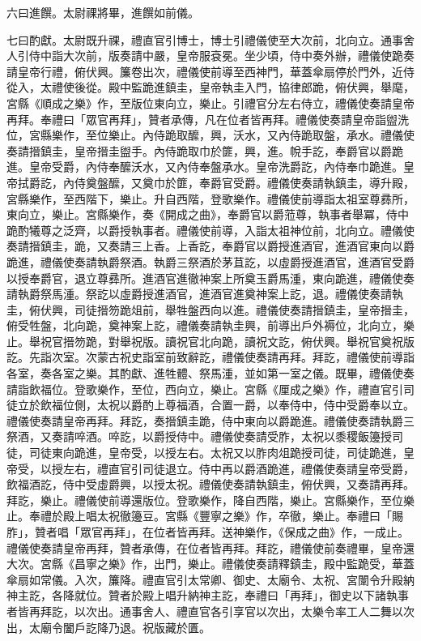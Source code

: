 \begin{pinyinscope}
 六曰進饌。太尉祼將畢，進饌如前儀。



 七曰酌獻。太尉既升祼，禮直官引博士，博士引禮儀使至大次前，北向立。通事舍人引侍中詣大次前，版奏請中嚴，皇帝服袞冕。坐少頃，侍中奏外辦，禮儀使跪奏請皇帝行禮，俯伏興。簾卷出次，禮儀使前導至西神門，華蓋傘扇停於門外，近侍從入，太禮使後從。殿中監跪進鎮圭，皇帝執圭入門，協律郎跪，俯伏興，舉麾，宮縣《順成之樂》作，至版位東向立，樂止。引禮官分左右侍立，禮儀使奏請皇帝再拜。奉禮曰「眾官再拜」，贊者承傳，凡在位者皆再拜。禮儀使奏請皇帝詣盥洗位，宮縣樂作，至位樂止。內侍跪取醿，興，沃水，又內侍跪取盤，承水。禮儀使奏請搢鎮圭，皇帝搢圭盥手。內侍跪取巾於篚，興，進。帨手訖，奉爵官以爵跪進。皇帝受爵，內侍奉醿沃水，又內侍奉盤承水。皇帝洗爵訖，內侍奉巾跪進。皇帝拭爵訖，內侍奠盤醿，又奠巾於篚，奉爵官受爵。禮儀使奏請執鎮圭，導升殿，宮縣樂作，至西階下，樂止。升自西階，登歌樂作。禮儀使前導詣太祖室尊彞所，東向立，樂止。宮縣樂作，奏《開成之曲》，奉爵官以爵蒞尊，執事者舉冪，侍中跪酌犧尊之泛齊，以爵授執事者。禮儀使前導，入詣太祖神位前，北向立。禮儀使奏請搢鎮圭，跪，又奏請三上香。上香訖，奉爵官以爵授進酒官，進酒官東向以爵跪進，禮儀使奏請執爵祭酒。執爵三祭酒於茅苴訖，以虛爵授進酒官，進酒官受爵以授奉爵官，退立尊彞所。進酒官進徹神案上所奠玉爵馬湩，東向跪進，禮儀使奏請執爵祭馬湩。祭訖以虛爵授進酒官，進酒官進奠神案上訖，退。禮儀使奏請執圭，俯伏興，司徒搢笏跪俎前，舉牲盤西向以進。禮儀使奏請搢鎮圭，皇帝搢圭，俯受牲盤，北向跪，奠神案上訖，禮儀奏請執圭興，前導出戶外褥位，北向立，樂止。舉祝官搢笏跪，對舉祝版。讀祝官北向跪，讀祝文訖，俯伏興。舉祝官奠祝版訖。先詣次室。次蒙古祝史詣室前致辭訖，禮儀使奏請再拜。拜訖，禮儀使前導詣各室，奏各室之樂。其酌獻、進牲體、祭馬湩，並如第一室之儀。既畢，禮儀使奏請詣飲福位。登歌樂作，至位，西向立，樂止。宮縣《厘成之樂》作，禮直官引司徒立於飲福位側，太祝以爵酌上尊福酒，合置一爵，以奉侍中，侍中受爵奉以立。禮儀使奏請皇帝再拜。拜訖，奏搢鎮圭跪，侍中東向以爵跪進。禮儀使奏請執爵三祭酒，又奏請啐酒。啐訖，以爵授侍中。禮儀使奏請受胙，太祝以黍稷飯籩授司徒，司徒東向跪進，皇帝受，以授左右。太祝又以胙肉俎跪授司徒，司徒跪進，皇帝受，以授左右，禮直官引司徒退立。侍中再以爵酒跪進，禮儀使奏請皇帝受爵，飲福酒訖，侍中受虛爵興，以授太祝。禮儀使奏請執鎮圭，俯伏興，又奏請再拜。拜訖，樂止。禮儀使前導還版位。登歌樂作，降自西階，樂止。宮縣樂作，至位樂止。奉禮於殿上唱太祝徹籩豆。宮縣《豐寧之樂》作，卒徹，樂止。奉禮曰「賜胙」，贊者唱「眾官再拜」，在位者皆再拜。送神樂作，《保成之曲》作，一成止。禮儀使奏請皇帝再拜，贊者承傳，在位者皆再拜。拜訖，禮儀使前奏禮畢，皇帝還大次。宮縣《昌寧之樂》作，出門，樂止。禮儀使奏請釋鎮圭，殿中監跪受，華蓋傘扇如常儀。入次，簾降。禮直官引太常卿、御史、太廟令、太祝、宮闈令升殿納神主訖，各降就位。贊者於殿上唱升納神主訖，奉禮曰「再拜」，御史以下諸執事者皆再拜訖，以次出。通事舍人、禮直官各引享官以次出，太樂令率工人二舞以次出，太廟令闔戶訖降乃退。祝版藏於匱。




\end{pinyinscope}
